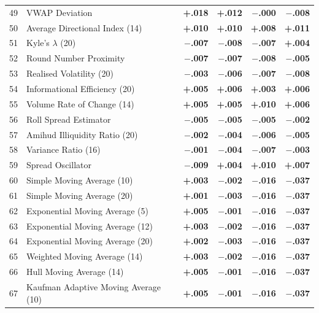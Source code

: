 \documentclass[12pt,a4paper]{article}
\theoremstyle{definition}
\theoremstyle{remark}
\newcommand{\pos}[1]{\textcolor{green1}{\textbf{+#1}}}
\newcommand{\negval}[1]{\textcolor{accent}{\textbf{$-$#1}}}
\begin{document}
\begin{longtable}{c>{\RaggedRight\arraybackslash}p{6.5cm}rrrr}
49 & VWAP Deviation          & \pos{.018} & \pos{.012} & \negval{.000} & \negval{.008} \\
50 & Average Directional Index (14)            & \pos{.010} & \pos{.010} & \pos{.008} & \pos{.011} \\
51 & Kyle's $\lambda$ (20)   & \negval{.007} & \negval{.008} & \negval{.007} & \pos{.004} \\
52 & Round Number Proximity& \negval{.007} & \negval{.007} & \negval{.008} & \negval{.005} \\
53 & Realised Volatility (20)  & \negval{.003} & \negval{.006} & \negval{.007} & \negval{.008} \\
54 & Informational Efficiency (20)   & \pos{.005} & \pos{.006} & \pos{.003} & \pos{.006} \\
55 & Volume Rate of Change (14)           & \pos{.005} & \pos{.005} & \pos{.010} & \pos{.006} \\
56 & Roll Spread Estimator       & \negval{.005} & \negval{.005} & \negval{.005} & \negval{.002} \\
57 & Amihud Illiquidity Ratio (20)         & \negval{.002} & \negval{.004} & \negval{.006} & \negval{.005} \\
58 & Variance Ratio (16)& \negval{.001} & \negval{.004} & \negval{.007} & \negval{.003} \\
59 & Spread Oscillator        & \negval{.009} & \pos{.004} & \pos{.010} & \pos{.007} \\
60 & Simple Moving Average (10)            & \pos{.003} & \negval{.002} & \negval{.016} & \negval{.037} \\
61 & Simple Moving Average (20)            & \pos{.001} & \negval{.003} & \negval{.016} & \negval{.037} \\
62 & Exponential Moving Average (5)             & \pos{.005} & \negval{.001} & \negval{.016} & \negval{.037} \\
63 & Exponential Moving Average (12)            & \pos{.003} & \negval{.002} & \negval{.016} & \negval{.037} \\
64 & Exponential Moving Average (20)            & \pos{.002} & \negval{.003} & \negval{.016} & \negval{.037} \\
65 & Weighted Moving Average (14)            & \pos{.003} & \negval{.002} & \negval{.016} & \negval{.037} \\
66 & Hull Moving Average (14)            & \pos{.005} & \negval{.001} & \negval{.016} & \negval{.037} \\
67 & Kaufman Adaptive Moving Average (10)           & \pos{.005} & \negval{.001} & \negval{.016} & \negval{.037} \\

\end{longtable}
\end{document}
